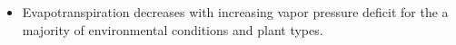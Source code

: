 \documentclass{article}
\begin{document}
\begin{itemize}
 \item Evapotranspiration decreases with increasing vapor pressure deficit for the a majority of environmental conditions and plant types.

\end{itemize}
\end{document}
